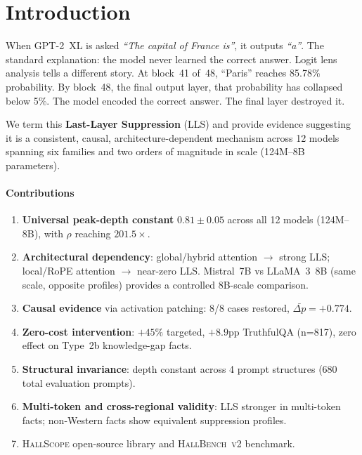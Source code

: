 \documentclass{article}
\begin{document}
\section{Introduction}

When GPT-2~XL is asked \textit{``The capital of France is''}, it outputs \textit{``a''}.
The standard explanation: the model never learned the correct answer.
Logit lens analysis tells a different story.
At block~41 of~48, ``Paris'' reaches 85.78\% probability.
By block~48, the final output layer, that probability has collapsed below 5\%.
The model encoded the correct answer. The final layer destroyed it.

We term this \textbf{Last-Layer Suppression} (LLS) and provide evidence
suggesting it is a consistent, causal, architecture-dependent mechanism
across 12 models spanning six families and two orders of magnitude in scale
(124M--8B parameters).

\paragraph{Contributions}
\begin{enumerate}[leftmargin=1.8em,topsep=2pt,itemsep=2pt,label=\arabic*.]
  \item \textbf{Universal peak-depth constant} $0.81\pm0.05$ across all 12 models
        (124M--8B), with $\rho$ reaching $201.5\times$.
  \item \textbf{Architectural dependency}: global/hybrid attention $\to$ strong LLS;
        local/RoPE attention $\to$ near-zero LLS.
        Mistral~7B vs LLaMA~3~8B (same scale, opposite profiles) provides a
        controlled 8B-scale comparison.
  \item \textbf{Causal evidence} via activation patching: 8/8 cases
        restored, $\bar{\Delta p}=+0.774$.
  \item \textbf{Zero-cost intervention}: $+45\%$ targeted, $+8.9$pp TruthfulQA
        (n=817), zero effect on Type~2b knowledge-gap facts.
  \item \textbf{Structural invariance}: depth constant across 4 prompt structures
        (680 total evaluation prompts).
  \item \textbf{Multi-token and cross-regional validity}: LLS stronger in
        multi-token facts; non-Western facts show equivalent suppression profiles.
  \item \textsc{HallScope} open-source library and \textsc{HallBench~v2} benchmark.
\end{enumerate}
\end{document}
